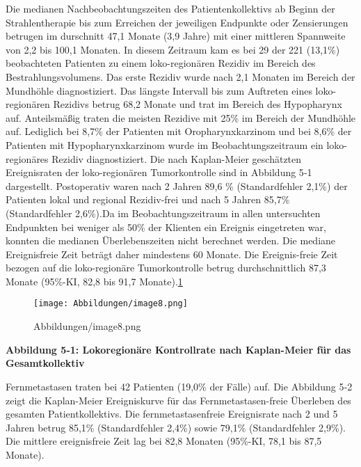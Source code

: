 Die medianen Nachbeobachtungszeiten des Patientenkollektivs ab Beginn der Strahlentherapie bis zum Erreichen der jeweiligen Endpunkte oder Zensierungen betrugen im durschnitt 47,1 Monate (3,9 Jahre) mit einer mittleren Spannweite von 2,2 bis 100,1 Monaten. In diesem Zeitraum kam es bei 29 der 221 (13,1\%) beobachteten Patienten zu einem loko-regionären Rezidiv im Bereich des Bestrahlungsvolumens. Das erste Rezidiv wurde nach 2,1 Monaten im Bereich der Mundhöhle diagnostiziert. Das längste Intervall bis zum Auftreten eines loko-regionären Rezidivs betrug 68,2 Monate und trat im Bereich des Hypopharynx auf. Anteilsmäßig traten die meisten Rezidive mit 25\% im Bereich der Mundhöhle auf. Lediglich bei 8,7\% der Patienten mit Oropharynxkarzinom und bei 8,6\% der Patienten mit Hypopharynxkarzinom wurde im Beobachtungszeitraum ein loko-regionäres Rezidiv diagnostiziert. Die nach Kaplan-Meier geschätzten Ereignisraten der loko-regionären Tumorkontrolle sind in Abbildung 5‑1 dargestellt. Postoperativ waren nach 2 Jahren 89,6 \% (Standardfehler 2,1\%) der Patienten lokal und regional Rezidiv-frei und nach 5 Jahren 85,7\% (Standardfehler 2,6\%).Da im Beobachtungszeitraum in allen untersuchten Endpunkten bei weniger als 50\% der Klienten ein Ereignis eingetreten war, konnten die medianen Überlebenszeiten nicht berechnet werden. Die mediane Ereignisfreie Zeit beträgt daher mindestens 60 Monate. Die Ereignis-freie Zeit bezogen auf die loko-regionäre Tumorkontrolle betrug durchschnittlich 87,3 Monate (95\%-KI, 82,8 bis 91,7 Monate).\href{about:blank\#fn1}{1}

\begin{fignos:no-prefix-figure-caption}

\begin{figure}
\centering
\texttt{[image: Abbildungen/image8.png]}
\caption{Abbildungen/image8.png}
\end{figure}

\end{fignos:no-prefix-figure-caption}

\textbf{Abbildung 5‑1: Lokoregionäre Kontrollrate nach Kaplan-Meier für das Gesamtkollektiv}

Fernmetastasen traten bei 42 Patienten (19,0\% der Fälle) auf. Die Abbildung 5‑2 zeigt die Kaplan-Meier Ereigniskurve für das Fernmetastasen-freie Überleben des gesamten Patientkollektivs. Die fernmetastasenfreie Ereignisrate nach 2 und 5 Jahren betrug 85,1\% (Standardfehler 2,4\%) sowie 79,1\% (Standardfehler 2,9\%). Die mittlere ereignisfreie Zeit lag bei 82,8 Monaten (95\%-KI, 78,1 bis 87,5 Monate).

